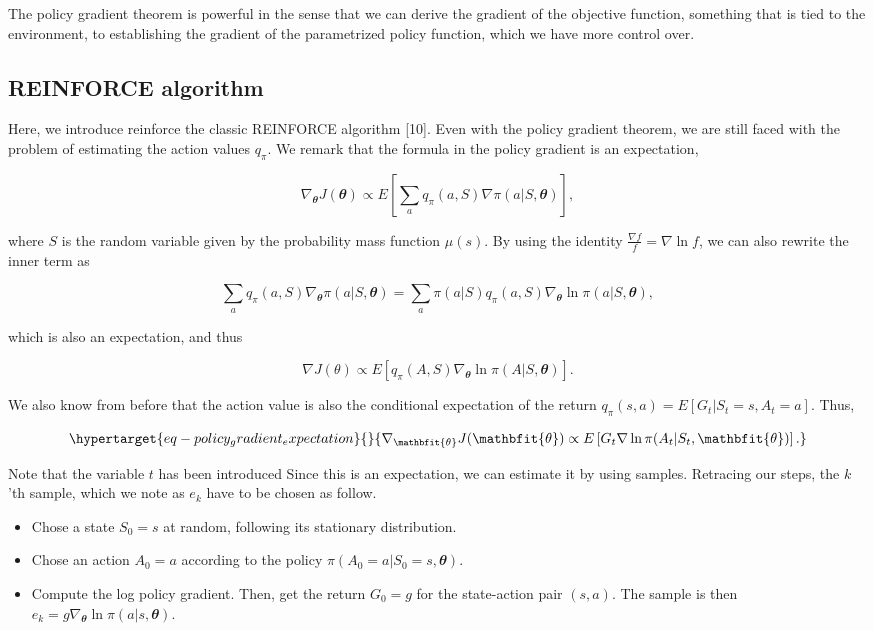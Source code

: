 \documentclass[
  letterpaper,
]{report}
\providecommand{\tightlist}{%
  \setlength{\itemsep}{0pt}\setlength{\parskip}{0pt}}\usepackage{longtable,booktabs,array}
\theoremstyle{plain}
\theoremstyle{definition}
\theoremstyle{definition}
\theoremstyle{remark}
\begin{document}
The policy gradient theorem is powerful in the sense that we can derive
the gradient of the objective function, something that is tied to the
environment, to establishing the gradient of the parametrized policy
function, which we have more control over.

\hypertarget{reinforce-algorithm}{%
\subsection{REINFORCE algorithm}\label{reinforce-algorithm}}

Here, we introduce reinforce the classic REINFORCE algorithm {[}10{]}.
Even with the policy gradient theorem, we are still faced with the
problem of estimating the action values \(q_\pi\). We remark that the
formula in the policy gradient is an expectation,

\[
\nabla_{\mathbfit{\theta}} J(\mathbfit{\theta}) \propto E\left[\sum_a q_\pi(a,S)\nabla \pi(a|S, \mathbfit{\theta})\right],
\]

where \(S\) is the random variable given by the probability mass
function \(\mu(s)\). By using the identity
\(\frac{\nabla f}{f} = \nabla \ln f\), we can also rewrite the inner
term as

\[
\sum_a q_\pi(a,S)\nabla_{\mathbfit{\theta}} \pi(a|S, {\mathbfit{\theta}}) = \sum_a \pi(a|S)q_\pi(a,S)\nabla_{\mathbfit{\theta}} \ln \pi(a|S, {\mathbfit{\theta}}),
\]

which is also an expectation, and thus

\[
\nabla J(\theta) \propto E\left[q_\pi(A,S)\nabla_{\mathbfit{\theta}} \ln \pi(A|S, {\mathbfit{\theta}})\right].
\]

We also know from before that the action value is also the conditional
expectation of the return \(q_\pi(s,a) = E[G_t|S_t = s, A_t = a]\).
Thus,

\begin{equation}\protect\hypertarget{eq-policy_gradient_expectation}{}{
\nabla_{\mathbfit{\theta}} J({\mathbfit{\theta}}) \propto E\left[G_t\nabla \ln \pi(A_t|S_t, {\mathbfit{\theta}})\right].
}\label{eq-policy_gradient_expectation}\end{equation}

Note that the variable \(t\) has been introduced Since this is an
expectation, we can estimate it by using samples. Retracing our steps,
the \(k\)'th sample, which we note as \(e_k\) have to be chosen as
follow.

\begin{itemize}
\tightlist
\item
  Chose a state \(S_0 = s\) at random, following its stationary
  distribution.
\item
  Chose an action \(A_0 = a\) according to the policy
  \(\pi(A_0 = a|S_0 = s, {\mathbfit{\theta}})\).
\item
  Compute the log policy gradient. Then, get the return \(G_0 = g\) for
  the state-action pair \((s,a)\). The sample is then
  \(e_k = g\nabla_{\mathbfit{\theta}} \ln \pi(a|s, {\mathbfit{\theta}})\).
\end{itemize}
\end{document}
